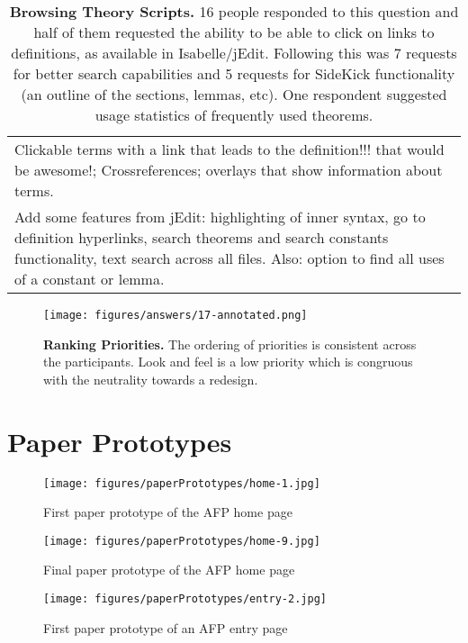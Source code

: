\documentclass[bsc,frontabs,oneside,singlespacing,parskip,deptreport,logo]{infthesis}
\begin{document}
\begin{table}[h!]
\begin{tabularx}{\textwidth}{X}
Clickable terms with a link that leads to the definition!!! that would be awesome!; Crossreferences; overlays that show information about terms.\\
\footnotesize
Add some features from jEdit: highlighting of inner syntax, go to definition hyperlinks, search theorems and search constants functionality, text search across all files. Also: option to find all uses of a   constant or lemma.\\
\hline
\end{tabularx}
\vspace{0.3cm}
\caption{\textbf{Browsing Theory Scripts.}
    16 people responded to this question and half of them requested the ability to be able to click on links to definitions, as available in Isabelle/jEdit. Following this was 7 requests for better search capabilities and 5 requests for SideKick functionality (an outline of the sections, lemmas, etc). One respondent suggested usage statistics of frequently used theorems.}
    \label{fig:theory-scripts-2}
\end{table}

\begin{figure}[h]
    \centering
    \texttt{[image: figures/answers/17-annotated.png]}
    \caption{\textbf{Ranking Priorities.}
    The ordering of priorities is consistent across the participants. Look and feel is a low priority which is congruous with the neutrality towards a redesign.}
    \label{fig:ranking-priorities}
    \medskip
\end{figure}

\clearpage

\chapter{Paper Prototypes}

\begin{figure}[h]
    \centering
    \texttt{[image: figures/paperPrototypes/home-1.jpg]}
    \caption{First paper prototype of the AFP home page}

\end{figure}

\begin{figure}[h]
    \centering
    \texttt{[image: figures/paperPrototypes/home-9.jpg]}
    \caption{Final paper prototype of the AFP home page}

\end{figure}

\begin{figure}[h]
    \centering
    \texttt{[image: figures/paperPrototypes/entry-2.jpg]}
    \caption{First paper prototype of an AFP entry page}

\end{figure}
\end{document}
